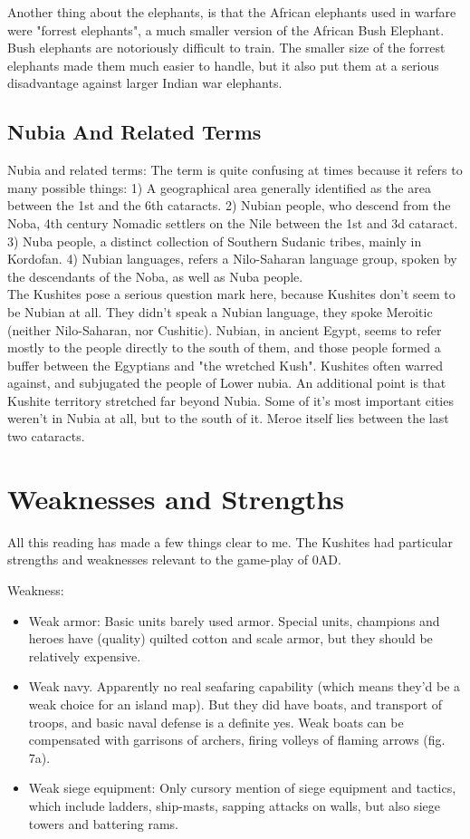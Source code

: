 \documentclass[a4paper,12pt]{scrreprt}
\begin{document}
Another thing about the elephants, is that the African elephants used in warfare were "forrest elephants", a much smaller version of the African Bush Elephant. Bush elephants are notoriously difficult to train. The smaller size of the forrest elephants made them much easier to handle, but it also put them at a serious disadvantage against larger Indian war elephants. 

\subsection{Nubia And Related Terms}

Nubia and related terms: The term is quite confusing at times because it refers to many possible things: 1) A geographical area generally identified as the area between the 1st and the 6th cataracts. 2) Nubian people, who descend from the Noba, 4th century Nomadic settlers on the Nile between the 1st and 3d cataract. 3) Nuba people, a distinct collection of Southern Sudanic tribes, mainly in Kordofan. 4) Nubian languages, refers a Nilo-Saharan language group, spoken by the descendants of the Noba, as well as Nuba people.\\  

The Kushites pose a serious question mark here, because Kushites don't seem to be Nubian at all. They didn't speak a Nubian language, they spoke Meroitic (neither Nilo-Saharan, nor Cushitic). Nubian, in ancient Egypt, seems to refer mostly to the people directly to the south of them, and those people formed a buffer between the Egyptians and "the wretched Kush". Kushites often warred against, and subjugated the people of Lower nubia. An additional point is that Kushite territory stretched far beyond Nubia. Some of it's most important cities weren't in Nubia at all, but to the south of it. Meroe itself lies between the last two cataracts. 

\section{Weaknesses and Strengths}

All this reading has made a few things clear to me. The Kushites had particular strengths and weaknesses relevant to the game-play of 0AD.

Weakness:

\begin{itemize}
	\item Weak armor: Basic units barely used armor. Special units, champions and heroes have (quality) quilted cotton and scale armor, but they should be relatively expensive.
	\item Weak navy. Apparently no real seafaring capability (which means they’d be a weak choice for an island map). But they did have boats, and transport of troops, and basic naval defense is a definite yes. Weak boats can be compensated with garrisons of archers, firing volleys of flaming arrows (fig. 7a).
	\item Weak siege equipment: Only cursory mention of siege equipment and tactics, which include ladders, ship-masts, sapping attacks on walls, but also siege towers and battering rams.
\end{itemize}
\end{document}
